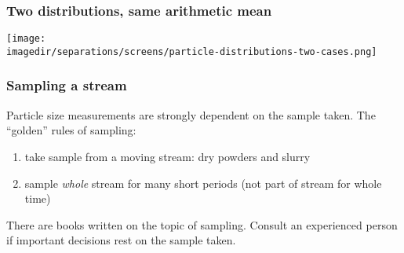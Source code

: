 \begin{frame}\frametitle{Two distributions, same arithmetic mean}
	\begin{center}
		\texttt{[image: \\imagedir/separations/screens/particle-distributions-two-cases.png]}
	\end{center}
\end{frame}

\begin{comment}
\begin{frame}\frametitle{Arithmetic means}	
	\vspace{12pt}
	\[
		\overline{x} = \int_{0}^{\infty}{x f(x) dx}
	\]
	\begin{enumerate}
		\item	take the size 
	\end{enumerate}
	\begin{itemize}
		\item	Arithmetic mean
		\item	Weight or mass-mean diameter		
		\item	Volume mean diameter
		\item	Surface mean diameter (Sauter mean diameter)
	\end{itemize}
\end{frame}

\begin{frame}\frametitle{Percent passing: cut size}
	\begin{exampleblock}{Now it should be clearer}
		``powder of 75 to 90 percent passing a 200-mesh sieve''
	\end{exampleblock}
	
	\todo{show a cumulative histogram; draw a vertical line}	
\end{frame}
\end{comment}

\begin{frame}\frametitle{Sampling a stream}
	Particle size measurements are strongly dependent on the sample taken. The ``golden'' rules of sampling:
	
	\begin{enumerate}
		\item	take sample from a moving stream: dry powders and slurry
		\item	sample \emph{whole} stream for many short periods (not part of stream for whole time)
	\end{enumerate}
	
	\vspace{12pt}
	There are books written on the topic of sampling. Consult an experienced person if important decisions rest on the sample taken.	
\end{frame}


